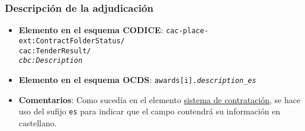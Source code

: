         \subsubsection{Descripción de la adjudicación}
            \begin{itemize}
                \item \textbf{Elemento en el esquema CODICE}:
                    \tabto{7.6cm} \texttt{cac-place-ext:ContractFolderStatus/} \\
                    \tabto{7.6cm} \texttt{cac:TenderResult/} \\
                    \tabto{7.6cm} \texttt{\textit{cbc:Description}}
                \item \textbf{Elemento en el esquema OCDS}:
                    \tabto{7.6cm} \texttt{awards[i].\textit{description\_es}}
                \item \textbf{Comentarios}: Como sucedía en el elemento  \hyperref[subsec:SistemaDeContratacion]{sistema de contratación}, se hace uso del sufijo \texttt{es} para indicar que el campo contendrá su información en castellano.
            \end{itemize}
            
\newpage